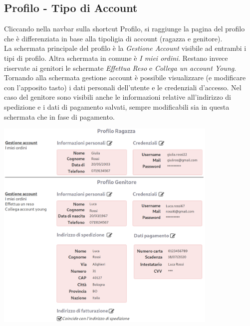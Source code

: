 \documentclass[12pt,a4paper]{report}
\begin{document}
\subsection{Profilo - Tipo di Account}
Cliccando nella navbar sulla shortcut Profilo, si raggiunge la pagina del profilo che è differenziata in base alla tipoligia di account (ragazza e genitore).\\
La schermata principale del profilo è la \textit{Gestione Account} visibile ad entrambi i tipi di profilo. Altra schermata in comune è \textit{I miei ordini}. Restano invece riservate ai genitori le schermate \textit{Effettua Reso} e \textit{Collega un account Young}.\\
Tornando alla schermata gestione account è possibile visualizzare (e modificare con l'apposito tasto) i dati personali dell'utente e le credenziali d'accesso. Nel caso del genitore sono visibili anche le informazioni relative all'indirizzo di spedizione e i dati di pagamento salvati, sempre modificabili sia in questa schermata che in fase di pagamento.
\begin{center}
  \includegraphics[width=0.8\textwidth]{"Images Latex/Immagini Wireframe/Desktop/15 - Profili"}
\end{center}
\end{document}
